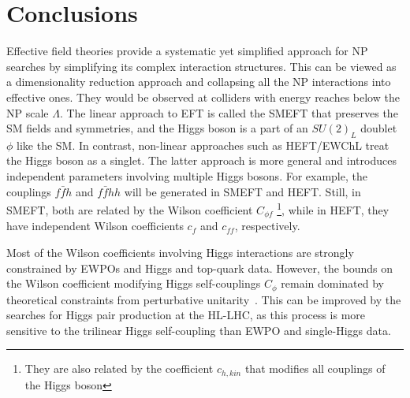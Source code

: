 \section{Conclusions \label{sec:concefts}}
\par Effective field theories provide a systematic yet simplified approach for NP searches by simplifying its complex interaction structures. This can be viewed as a dimensionality reduction approach and collapsing all the NP interactions into effective ones. They would be observed at colliders with energy reaches below the NP scale $\Lambda$. The linear approach to EFT is called the SMEFT that preserves the SM fields and symmetries, and the Higgs boson is a part of an $SU(2)_L$ doublet $\phi$ like the SM. In contrast, non-linear approaches such as HEFT/EWChL treat the Higgs boson as a singlet. The latter approach is more general and introduces independent parameters involving multiple Higgs bosons. For example, the couplings $f\bar f h$ and $ f\bar f hh$ will be generated in SMEFT and HEFT. Still, in SMEFT, both are related by the Wilson coefficient $C_{\phi f}$ \footnote{They are also related by the coefficient $c_{h,kin}$ that modifies all couplings of the Higgs boson}, while in HEFT, they have independent  Wilson coefficients $c_f$ and $c_{ff}$, respectively. 
\par Most of the Wilson coefficients involving Higgs interactions are strongly constrained by EWPOs and Higgs and top-quark data. However, the bounds on the Wilson coefficient modifying Higgs self-couplings $C_\phi$ remain dominated by theoretical constraints from perturbative unitarity~\cite{DiLuzio:2017tfn,DiVita:2017vrr}. This can be improved by the searches for Higgs pair production at the HL-LHC, as this process is more sensitive to the trilinear Higgs self-coupling than EWPO and single-Higgs data.
